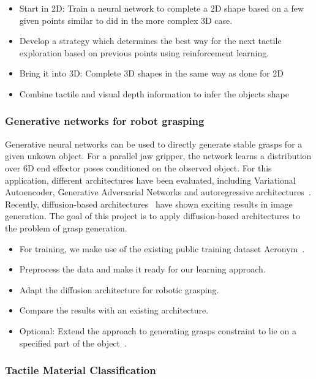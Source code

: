 \documentclass[a4paper]{article}
\begin{document}
\begin{itemize}
  \item Start in 2D: Train a neural network to complete a 2D shape based on a few given points similar to \citet{watkins2019multi} did in the more complex 3D case.
  \item Develop a strategy which determines the best way for the next tactile exploration based on previous points using reinforcement learning.
  \item Bring it into 3D: Complete 3D shapes in the same way as done for 2D
  \item Combine tactile and visual depth information to infer the objects shape
\end{itemize}


\subsubsection{Generative networks for robot grasping}
Generative neural networks can be used to directly generate stable grasps for a given unkown object.
For a parallel jaw gripper, the network learns a distribution over 6D end effector poses conditioned on the observed object.
For this application, different architectures have been evaluated, including Variational Autoencoder, Generative Adversarial Networks and autoregressive architectures~\citet{winkelbauer2022}.
Recently, diffusion-based architectures~\cite{ho2020denoising} have shown exciting results in image generation.
The goal of this project is to apply diffusion-based architectures to the problem of grasp generation.
\begin{itemize}
  \item For training, we make use of the existing public training dataset Acronym~\cite{acronym2020}.
  \item Preprocess the data and make it ready for our learning approach.
  \item Adapt the diffusion architecture for robotic grasping.
  \item Compare the results with an existing architecture.
  \item Optional: Extend the approach to generating grasps constraint to lie on a specified part of the object~\cite{lundell2023constrained}.
\end{itemize}

\subsubsection{Tactile Material Classification}
\end{document}
